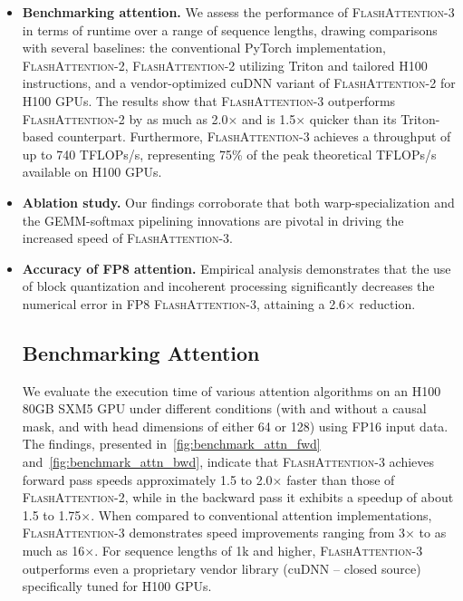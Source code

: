 \begin{itemize}

\item \textbf{Benchmarking attention.} We assess the performance of \textsc{FlashAttention-3} in terms of runtime over a range of sequence lengths, drawing comparisons with several baselines: the conventional PyTorch implementation, \textsc{FlashAttention-2}, \textsc{FlashAttention-2} utilizing Triton and tailored H100 instructions, and a vendor-optimized cuDNN variant of \textsc{FlashAttention-2} for H100 GPUs. The results show that \textsc{FlashAttention-3} outperforms \textsc{FlashAttention-2} by as much as 2.0$\times$ and is 1.5$\times$ quicker than its Triton-based counterpart. Furthermore, \textsc{FlashAttention-3} achieves a throughput of up to 740 TFLOPs/s, representing 75\% of the peak theoretical TFLOPs/s available on H100 GPUs.

\item \textbf{Ablation study.} Our findings corroborate that both warp-specialization and the GEMM-softmax pipelining innovations are pivotal in driving the increased speed of \textsc{FlashAttention-3}.

\item \textbf{Accuracy of FP8 attention.} Empirical analysis demonstrates that the use of block quantization and incoherent processing significantly decreases the numerical error in FP8 \textsc{FlashAttention-3}, attaining a 2.6$\times$ reduction.

\subsection{Benchmarking Attention}
\label{subsec:benchmark_attn}

We evaluate the execution time of various attention algorithms on an H100 80GB SXM5 GPU under different conditions (with and without a causal mask, and with head dimensions of either 64 or 128) using FP16 input data. The findings, presented in~\cref{fig:benchmark_attn_fwd} and~\cref{fig:benchmark_attn_bwd}, indicate that \textsc{FlashAttention-3} achieves forward pass speeds approximately 1.5 to 2.0$\times$ faster than those of \textsc{FlashAttention-2}, while in the backward pass it exhibits a speedup of about 1.5 to 1.75$\times$. When compared to conventional attention implementations, \textsc{FlashAttention-3} demonstrates speed improvements ranging from 3$\times$ to as much as 16$\times$. For sequence lengths of 1k and higher, \textsc{FlashAttention-3} outperforms even a proprietary vendor library (cuDNN -- closed source) specifically tuned for H100 GPUs.


\end{itemize}
